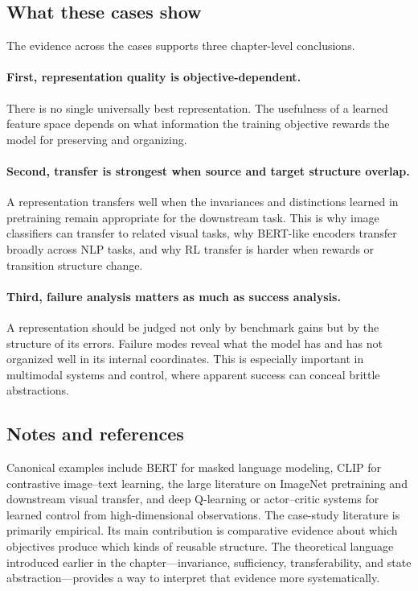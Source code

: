 \subsection*{What these cases show}

The evidence across the cases supports three chapter-level conclusions.

\paragraph{First, representation quality is objective-dependent.}
There is no single universally best representation.
The usefulness of a learned feature space depends on what information the training objective rewards the model for preserving and organizing.

\paragraph{Second, transfer is strongest when source and target structure overlap.}
A representation transfers well when the invariances and distinctions learned in pretraining remain appropriate for the downstream task.
This is why image classifiers can transfer to related visual tasks, why BERT-like encoders transfer broadly across NLP tasks, and why RL transfer is harder when rewards or transition structure change.

\paragraph{Third, failure analysis matters as much as success analysis.}
A representation should be judged not only by benchmark gains but by the structure of its errors.
Failure modes reveal what the model has and has not organized well in its internal coordinates.
This is especially important in multimodal systems and control, where apparent success can conceal brittle abstractions.

\subsection*{Notes and references}

Canonical examples include BERT for masked language modeling, CLIP for contrastive image--text learning, the large literature on ImageNet pretraining and downstream visual transfer, and deep Q-learning or actor--critic systems for learned control from high-dimensional observations.
The case-study literature is primarily empirical.
Its main contribution is comparative evidence about which objectives produce which kinds of reusable structure.
The theoretical language introduced earlier in the chapter---invariance, sufficiency, transferability, and state abstraction---provides a way to interpret that evidence more systematically.
